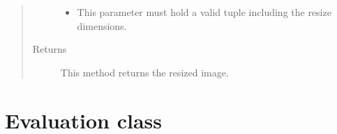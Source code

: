 \documentclass[letterpaper,10pt,english,openany,oneside]{sphinxmanual}
\begin{document}
\begin{fulllineitems}
\begin{fulllineitems}
\begin{quote}
\begin{description}
\begin{itemize}
\item {} 
 \textendash{} This parameter must hold a valid tuple including the resize dimensions.

\end{itemize}

\item[{Returns}] \leavevmode
This method returns the resized image.

\end{description}\end{quote}

\end{fulllineitems}


\end{fulllineitems}



\section{Evaluation class}
\label{\detokenize{Evaluation:evaluation-class}}\label{\detokenize{Evaluation::doc}}
\end{document}
